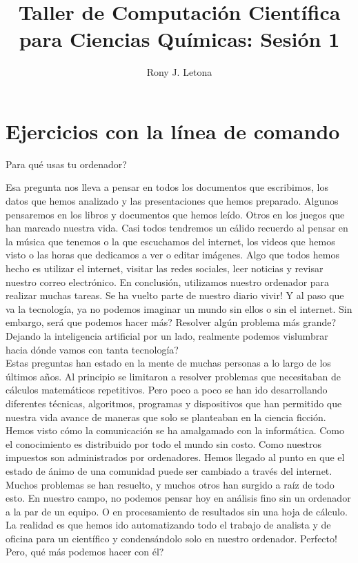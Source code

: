 \documentclass[10pt,letterpaper]{article}
\author{Rony J. Letona}
\title{Taller de Computaci\'on Cient\'ifica para Ciencias Qu\'imicas: Sesi\'on 1}
\begin{document}
\maketitle

\section{Ejercicios con la l\'inea de comando}

\begin{center}
{\large \noindent Para qu\'e usas tu ordenador?}\\
\end{center}

Esa pregunta nos lleva a pensar en todos los documentos que escribimos, los datos que hemos analizado y las presentaciones que hemos preparado. Algunos pensaremos en los libros y documentos que hemos le\'ido. Otros en los juegos que han marcado nuestra vida. Casi todos tendremos un c\'alido recuerdo al pensar en la m\'usica que tenemos o la que escuchamos del internet, los videos que hemos visto o las horas que dedicamos a ver o editar im\'agenes. Algo que todos hemos hecho es utilizar el internet, visitar las redes sociales, leer noticias y revisar nuestro correo electr\'onico. En conclusi\'on, utilizamos nuestro ordenador para realizar muchas tareas. Se ha vuelto parte de nuestro diario vivir! Y al paso que va la tecnolog\'ia, ya no podemos imaginar un mundo sin ellos o sin el internet. Sin embargo, ser\'a que podemos hacer m\'as? Resolver alg\'un problema m\'as grande? Dejando la inteligencia artificial por un lado, realmente podemos vislumbrar hacia d\'onde vamos con tanta tecnolog\'ia?\\

Estas preguntas han estado en la mente de muchas personas a lo largo de los \'ultimos a\~nos. Al principio se limitaron a resolver problemas que necesitaban de c\'alculos matem\'aticos repetitivos. Pero poco a poco se han ido desarrollando diferentes t\'ecnicas, algoritmos, programas y dispositivos que han permitido que nuestra vida avance de maneras que solo se planteaban en la ciencia ficci\'on. Hemos visto c\'omo la comunicaci\'on se ha amalgamado con la inform\'atica. Como el conocimiento es distribuido por todo el mundo sin costo. Como nuestros impuestos son administrados por ordenadores. Hemos llegado al punto en que el estado de \'animo de una comunidad puede ser cambiado a trav\'es del internet. Muchos problemas se han resuelto, y muchos otros han surgido a ra\'iz de todo esto. En nuestro campo, no podemos pensar hoy en an\'alisis fino sin un ordenador a la par de un equipo. O en procesamiento de resultados sin una hoja de c\'alculo. La realidad es que hemos ido automatizando todo el trabajo de analista y de oficina para un cient\'ifico y condens\'andolo solo en nuestro ordenador. Perfecto! Pero, qu\'e m\'as podemos hacer con \'el?\\
\end{document}

